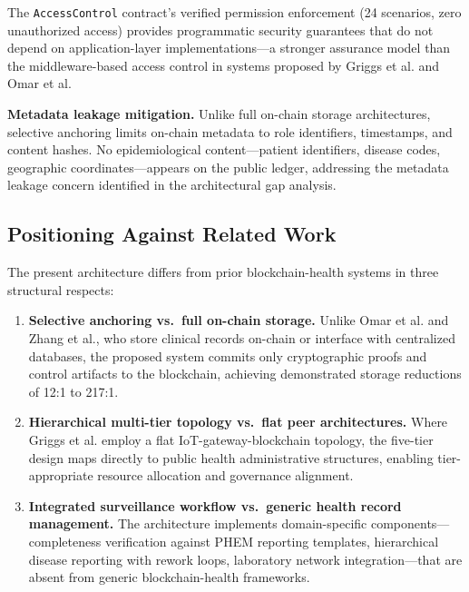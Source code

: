 The \texttt{AccessControl} contract's verified permission enforcement (24 scenarios, zero unauthorized access) provides programmatic security guarantees that do not depend on application-layer implementations---a stronger assurance model than the middleware-based access control in systems proposed by Griggs et al.\cite{griggs2018healthcare} and Omar et al.\cite{omar2019privacy}

\textbf{Metadata leakage mitigation.} Unlike full on-chain storage architectures, selective anchoring limits on-chain metadata to role identifiers, timestamps, and content hashes. No epidemiological content---patient identifiers, disease codes, geographic coordinates---appears on the public ledger, addressing the metadata leakage concern identified in the architectural gap analysis.

\subsection{Positioning Against Related Work}\label{subsec:disc_positioning}

The present architecture differs from prior blockchain-health systems in three structural respects:

\begin{enumerate}
\item \textbf{Selective anchoring vs.\ full on-chain storage.} Unlike Omar et al.\cite{omar2019privacy} and Zhang et al.,\cite{zhang2018fhirchain} who store clinical records on-chain or interface with centralized databases, the proposed system commits only cryptographic proofs and control artifacts to the blockchain, achieving demonstrated storage reductions of 12:1 to 217:1.

\item \textbf{Hierarchical multi-tier topology vs.\ flat peer architectures.} Where Griggs et al.\cite{griggs2018healthcare} employ a flat IoT-gateway-blockchain topology, the five-tier design maps directly to public health administrative structures, enabling tier-appropriate resource allocation and governance alignment.

\item \textbf{Integrated surveillance workflow vs.\ generic health record management.} The architecture implements domain-specific components---completeness verification against PHEM reporting templates, hierarchical disease reporting with rework loops, laboratory network integration---that are absent from generic blockchain-health frameworks.
\end{enumerate}

